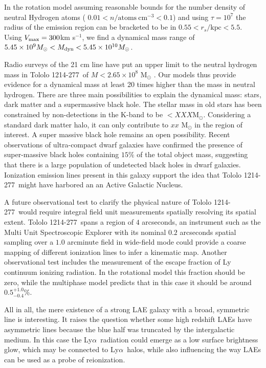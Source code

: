\documentclass[a4paper, usenatbib, 12pt]{article}
\newcommand{\tol}{Tololo 1214-277}
\newcommand{\lya}{Ly$\alpha$}
\begin{document}
{In the rotation model assuming reasonable bounds for the number
density of neutral Hydrogen atoms (
$0.01<n/\mathrm{atoms\ cm^{-3}}<0.1$) and using $\tau=10^7$ the radius
of the emission region can be bracketed to be in $0.55 <
r_s/\mathrm{kpc}< 5.5$.
Using $V_{\rm max}=300$km s$^{-1}$, we find a dynamical mass range of
$5.45\times 10^{9}M_{\odot} < M_{\rm dyn} < 5.45\times 10^{10} M_{\odot}$.  


Radio surveys of the 21 cm line have put an upper limit to the neutral
hydrogen mass in \tol\ of $M<2.65\times 10^{8}$ M$_{\odot}$
\cite{pustilnikmartin07}.  
Our models thus provide evidence for a dynamical mass at least 20 times
higher than the mass in neutral hydrogen.   
There are three main possibilities to explain the dynamical 
mass: stars, dark matter and a supermassive black hole. 
The stellar mass in old stars has been constrained by non-detections
in the K-band to be $<XXX$M$_{\odot}$.
Considering a standard dark matter halo, it can only contribute to
$xx$ M$_{\odot}$ in the region of interest. 
A super massive black hole remains an open possibility. 
Recent observations of ultra-compact dwarf galaxies
\cite{Seth2014} have confirmed the presence of super-massive black
holes containing $15\%$ of the total object mass, suggesting that
there is a large population of undetected black holes in dwarf
galaxies.  
Ionization emission lines present in this galaxy support the idea that
\tol\ might have harbored an an Active Galactic Nucleus.



A future observational test to clarify the physical nature of
\tol\ would require integral field unit measurements spatially
resolving its spatial extent. 
\tol\ spans a region of $4$ arcseconds,
an instrument such as the Multi Unit Spectroscopic Explorer with its
nominal $0.2$ arcseconds spatial sampling over a $1.0$ arcminute field
in wide-field mode could provide a coarse mapping of different
ionization lines to infer a kinematic map.
Another observational test includes the measurement of the escape
fraction of Ly continuum ionizing radiation. 
In the rotational model this fraction should be zero, while
the multiphase model predicts that in this case it should be around
$0.5^{+1.0}_{-0.4}$\%. 

All in all, the mere existence of a strong LAE galaxy with a broad,
symmetric line is interesting.
It raises the question whether some high redshift LAEs have asymmetric
lines because the blue half was truncated by the intergalactic medium.
In this case the \lya\ radiation could emerge as a low surface
brightness glow, which may be connected to \lya\ halos, while also
influencing the way LAEs can be used as a probe of reionization. 

}
\end{document}
